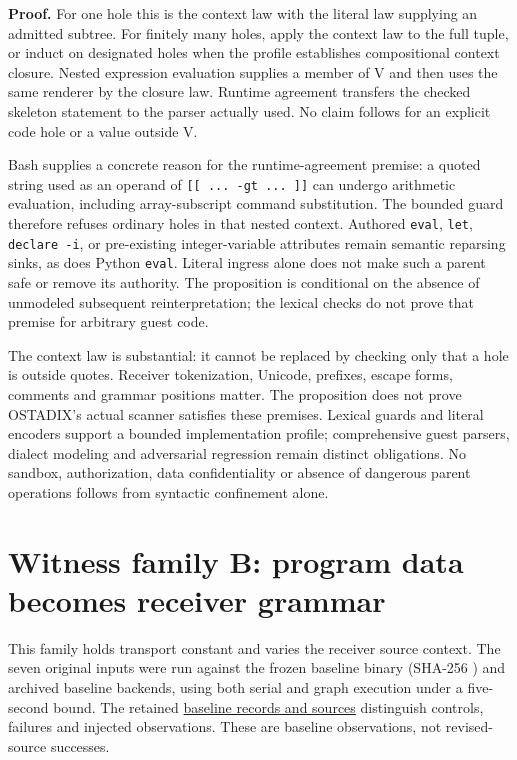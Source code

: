 \documentclass[11pt]{article}
\begin{document}
\textbf{Proof.} For one hole this is the context law with the literal law supplying an admitted subtree. For finitely many holes, apply the context law to the full tuple, or induct on designated holes when the profile establishes compositional context closure. Nested expression evaluation supplies a member of V and then uses the same renderer by the closure law. Runtime agreement transfers the checked skeleton statement to the parser actually used. No claim follows for an explicit code hole or a value outside V.

Bash supplies a concrete reason for the runtime-agreement premise: a quoted string used as an operand of \texttt{[[ ... -gt ... ]]} can undergo arithmetic evaluation, including array-subscript command substitution. The bounded guard therefore refuses ordinary holes in that nested context. Authored \texttt{eval}, \texttt{let}, \texttt{declare -i}, or pre-existing integer-variable attributes remain semantic reparsing sinks, as does Python \texttt{eval}. Literal ingress alone does not make such a parent safe or remove its authority. The proposition is conditional on the absence of unmodeled subsequent reinterpretation; the lexical checks do not prove that premise for arbitrary guest code.

The context law is substantial: it cannot be replaced by checking only that a hole is outside quotes. Receiver tokenization, Unicode, prefixes, escape forms, comments and grammar positions matter. The proposition does not prove OSTADIX's actual scanner satisfies these premises. Lexical guards and literal encoders support a bounded implementation profile; comprehensive guest parsers, dialect modeling and adversarial regression remain distinct obligations. No sandbox, authorization, data confidentiality or absence of dangerous parent operations follows from syntactic confinement alone.

\clearpage

\section{Witness family B: program data becomes receiver grammar}

This family holds transport constant and varies the receiver source context. The seven original inputs were run against the frozen baseline binary (SHA-256 \texttt{}) and archived baseline backends, using both serial and graph execution under a five-second bound. The retained \href{../../evidence/public-contract-20261111/README.md}{baseline records and sources} distinguish controls, failures and injected observations. These are baseline observations, not revised-source successes.
\end{document}
